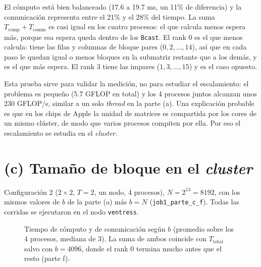 \documentclass[11pt,a4paper]{article}
\newcommand{\Tcomp}{T_{\text{comp}}}
\newcommand{\Tcomm}{T_{\text{comm}}}
\newcommand{\Ttot}{T_{\text{total}}}
\begin{document}
El cómputo está bien balanceado (17.6 a 19.7 ms, un 11\% de diferencia) y la comunicación representa entre el 21\% y el 28\% del tiempo. La suma $\Tcomp+\Tcomm$ es casi igual en los cuatro procesos: el que calcula menos espera más, porque esa espera queda dentro de los \texttt{Bcast}. El rank 0 es el que menos calcula: tiene las filas y columnas de bloque pares ($0,2,\dots,14$), así que en cada paso le quedan igual o menos bloques en la submatriz restante que a los demás, y es el que más espera. El rank 3 tiene las impares ($1,3,\dots,15$) y es el caso opuesto.

Esta prueba sirve para validar la medición, no para estudiar el escalamiento: el problema es pequeño (5.7 GFLOP en total) y los 4 procesos juntos alcanzan unos 230 GFLOP/s, similar a un solo \emph{thread} en la parte (a). Una explicación probable es que en los chips de Apple la unidad de matrices es compartida por los cores de un mismo clúster, de modo que varios procesos compiten por ella. Por eso el escalamiento se estudia en el \emph{cluster}.

\section{(c) Tamaño de bloque en el \emph{cluster}}
Configuración 2 ($2\times2$, $T=2$, un nodo, 4 procesos), $N=2^{13}=8192$, con los mismos valores de $b$ de la parte (a) más $b=N$ (\texttt{job1\_parte\_c\_f}). Todas las corridas se ejecutaron en el nodo \texttt{ventress}.

\begin{figure}[H]\centering
{}
\caption{Tiempo de cómputo y de comunicación según $b$ (promedio sobre los 4 procesos, mediana de 3). La suma de ambos coincide con $\Ttot$ salvo con $b=4096$, donde el rank 0 termina mucho antes que el resto (parte f).}
\label{fig:c}
\end{figure}
\end{document}
